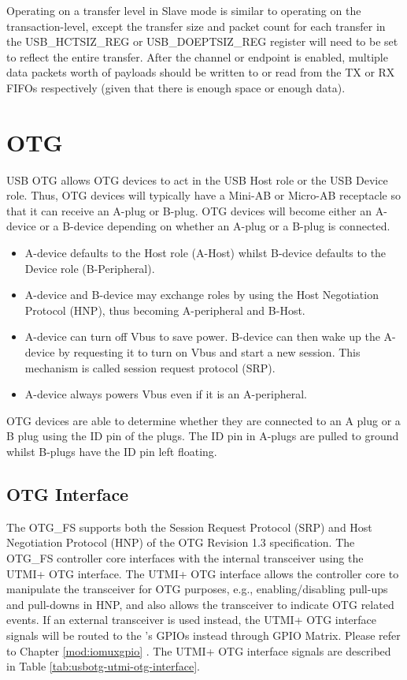 \documentclass[main\_\_EN.tex]{subfiles}
\begin{document}
Operating on a transfer level in Slave mode is similar to operating on the transaction-level, except the transfer size and packet count for each transfer in the USB\_HCTSIZ\_REG or USB\_DOEPTSIZ\_REG register will need to be set to reflect the entire transfer. After the channel or endpoint is enabled, multiple data packets worth of payloads should be written to or read from the TX or RX FIFOs respectively (given that there is enough space or enough data).

\section{OTG}

USB OTG allows OTG devices to act in the USB Host role or the USB Device role. Thus, OTG devices will typically have a Mini-AB or Micro-AB receptacle so that it can receive an A-plug or B-plug. OTG devices will become either an A-device or a B-device depending on whether an A-plug or a B-plug is connected.

\begin{itemize}
    \item A-device defaults to the Host role (A-Host) whilst B-device defaults to the Device role (B-Peripheral).
    \item A-device and B-device may exchange roles by using the Host Negotiation Protocol (HNP), thus becoming A-peripheral and B-Host.
    \item A-device can turn off Vbus to save power. B-device can then wake up the A-device by requesting it to turn on Vbus and start a new session. This mechanism is called session request protocol (SRP).
    \item A-device always powers Vbus even if it is an A-peripheral.
\end{itemize}

OTG devices are able to determine whether they are connected to an A plug or a B plug using the ID pin of the plugs. The ID pin in A-plugs are pulled to ground whilst B-plugs have the ID pin left floating.

\subsection{OTG Interface}

The OTG\_FS supports both the Session Request Protocol (SRP) and Host Negotiation Protocol (HNP) of the OTG Revision 1.3 specification. The OTG\_FS controller core interfaces with the internal transceiver using the UTMI+ OTG interface. The UTMI+ OTG interface allows the controller core to manipulate the transceiver for OTG purposes, e.g., enabling/disabling pull-ups and pull-downs in HNP, and also allows the transceiver to indicate OTG related events. If an external transceiver is used instead, the UTMI+ OTG interface signals will be routed to the \chipname{}’s GPIOs instead through GPIO Matrix. Please refer to Chapter \ref{mod:iomuxgpio} \textit{}. The UTMI+ OTG interface signals are described in Table \ref{tab:usbotg-utmi-otg-interface}.
\end{document}

